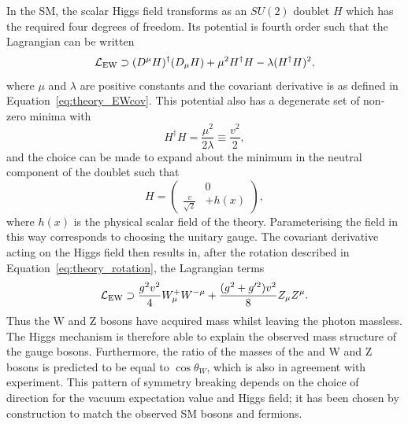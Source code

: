 In the SM, the scalar Higgs field transforms as an $SU(2)$ doublet $H$ 
which has the required four degrees of freedom. 
Its potential is fourth order such that the Lagrangian can be written 
\begin{equation}
\mathcal{L}_{\textrm{EW}} \supset (D^\mu H)^\dagger (D_\mu H) + \mu^2 H^\dagger H - \lambda (H^\dagger H)^2 ,
\end{equation}
where $\mu$ and $\lambda$ are positive constants 
and the covariant derivative is as defined in Equation~\ref{eq:theory_EWcov}.
This potential also has a degenerate set of non-zero minima with 
\begin{equation}
H^\dagger H = \frac{\mu^2}{2\lambda} \equiv \frac{v^2}{2} , 
\end{equation}
and the choice can be made to expand about the minimum 
in the neutral component of the doublet such that 
\begin{equation}
H = \left(
\begin{split}
&0 \\
\frac{v}{\sqrt{2}} &+ h(x)
\end{split}
\right) ,
\end{equation}
where $h(x)$ is the physical scalar field of the theory.
Parameterising the field in this way corresponds to choosing the unitary gauge.
The covariant derivative acting on the Higgs field then results in, 
after the rotation described in Equation~\ref{eq:theory_rotation}, the Lagrangian terms
\begin{equation}
\mathcal{L}_{\textrm{EW}} \supset \frac{g^2v^2}{4} W^+_\mu W^{-\mu} 
                         + \frac{(g^2 + g^{\prime 2})v^2}{8} Z_\mu Z^\mu .
\end{equation}
Thus the W and Z bosons have acquired mass whilst leaving the photon massless.
The Higgs mechanism is therefore able to explain the observed mass structure of the gauge bosons.
Furthermore, the ratio of the masses of the and W and Z bosons 
is predicted to be equal to $\cos{\theta_W}$, which is also in agreement with experiment.
This pattern of symmetry breaking depends on 
the choice of direction for the vacuum expectation value and Higgs field;
it has been chosen by construction to match the observed SM bosons and fermions. %


